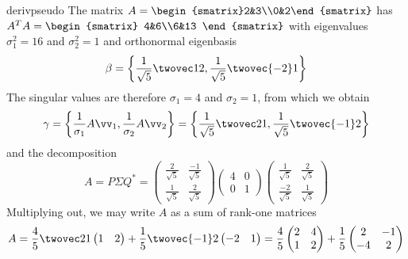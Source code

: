 \begin{examples}{}{derivpseudo}
\exstart The matrix $A=\begin{smatrix}2&3\\0&2\end{smatrix}$ has $A^TA=\begin{smatrix}
  4&6\\6&13
  \end{smatrix}$ with eigenvalues $\sigma_1^2=16$ and $\sigma_2^2=1$ and orthonormal eigenbasis
	\[\beta=\left\{\frac 1{\sqrt 5}\twovec 1{2},\frac 1{\sqrt 5}\twovec{-2}1\right\}\]
	The singular values are therefore $\sigma_1=4$ and $\sigma_2=1$, from which we obtain
	\[\gamma=\left\{\frac 1{\sigma_1}A\vv_1,\frac 1{\sigma_2}A\vv_2\right\}=\left\{\frac 1{\sqrt 5}\twovec 2{1},\frac 1{\sqrt 5}\twovec{-1}2\right\}\]
	and the decomposition
	\[A=P\Sigma Q^*=
	\begin{pmatrix}
  \frac 2{\sqrt 5}&\frac{-1}{\sqrt 5}\\
  \frac 1{\sqrt 5}&\frac 2{\sqrt 5}  
  \end{pmatrix}
  \begin{pmatrix}
  4&0\\0&1
  \end{pmatrix}
  \begin{pmatrix}
  \frac 1{\sqrt 5}&\frac 2{\sqrt 5}\\
  \frac{-2}{\sqrt 5}&\frac 1{\sqrt 5}  
  \end{pmatrix}\]
  Multiplying out, we may write $A$ as a sum of rank-one matrices
  \[A=\frac 45\twovec 21\begin{pmatrix}
  1&2
  \end{pmatrix}
  +
  \frac 15\twovec{-1}2\begin{pmatrix}
  -2&1
  \end{pmatrix}
  =\frac 45\begin{pmatrix}
  2&4\\
  1&2
  \end{pmatrix}
  +
  \frac 15\begin{pmatrix}
  2&-1\\-4&2
  \end{pmatrix}\]
  
  \goodbreak
  

\end{examples}
